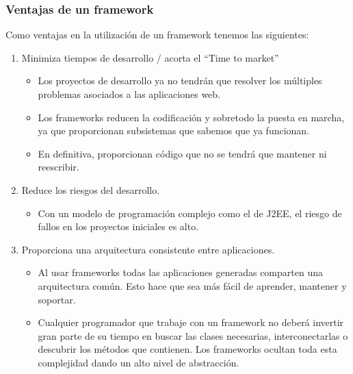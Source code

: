 \subsubsection {Ventajas de un framework}
Como ventajas en la utilización de un framework tenemos las siguientes:

\begin{enumerate}
	\item Minimiza tiempos de desarrollo / acorta el “Time to market”
	\begin{itemize}
	\item Los proyectos de desarrollo ya no tendrán que resolver los múltiples problemas asociados a las aplicaciones web.
	\item  Los frameworks reducen la codificación y sobretodo la puesta en marcha, ya que proporcionan subsistemas que sabemos que ya funcionan. \item  En definitiva, proporcionan código que no se tendrá que mantener ni reescribir.
	\end{itemize}
	\item Reduce los riesgos del desarrollo.
	\begin{itemize}
		\item Con un modelo de programación complejo como el de J2EE, el riesgo de fallos en los proyectos iniciales es alto.
	\end{itemize}
	\item Proporciona una arquitectura consistente entre aplicaciones.
	\begin{itemize}
		\item Al usar frameworks todas las aplicaciones generadas comparten una arquitectura común. Esto hace que sea más fácil de aprender, mantener y soportar.
		\item Cualquier programador que trabaje con un framework no deberá invertir gran parte de su tiempo en buscar las clases necesarias, interconectarlas o descubrir los métodos que contienen. Los frameworks ocultan toda esta complejidad dando un alto nivel de abstracción. 
	\end{itemize}
\end{enumerate}
